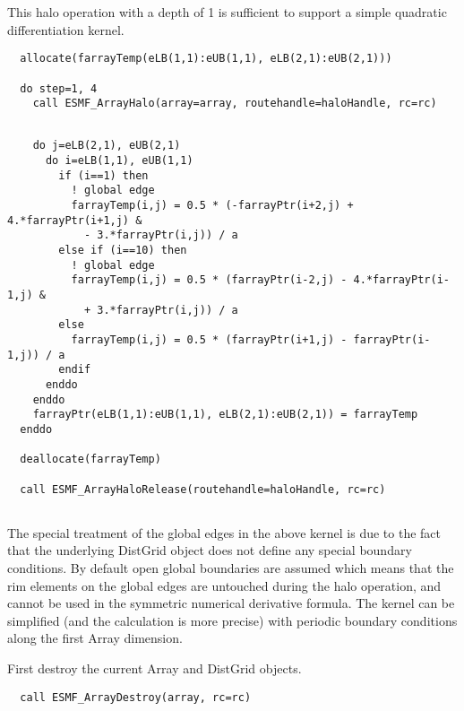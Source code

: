 
   This halo operation with a depth of 1 is sufficient to support a simple
   quadratic differentiation kernel. 

 \begin{verbatim}
  allocate(farrayTemp(eLB(1,1):eUB(1,1), eLB(2,1):eUB(2,1)))

  do step=1, 4
    call ESMF_ArrayHalo(array=array, routehandle=haloHandle, rc=rc)
 
\end{verbatim}
 

 \begin{verbatim}
    do j=eLB(2,1), eUB(2,1)
      do i=eLB(1,1), eUB(1,1)
        if (i==1) then
          ! global edge
          farrayTemp(i,j) = 0.5 * (-farrayPtr(i+2,j) + 4.*farrayPtr(i+1,j) &
            - 3.*farrayPtr(i,j)) / a
        else if (i==10) then
          ! global edge
          farrayTemp(i,j) = 0.5 * (farrayPtr(i-2,j) - 4.*farrayPtr(i-1,j) &
            + 3.*farrayPtr(i,j)) / a
        else
          farrayTemp(i,j) = 0.5 * (farrayPtr(i+1,j) - farrayPtr(i-1,j)) / a
        endif
      enddo
    enddo
    farrayPtr(eLB(1,1):eUB(1,1), eLB(2,1):eUB(2,1)) = farrayTemp
  enddo
  
  deallocate(farrayTemp)

  call ESMF_ArrayHaloRelease(routehandle=haloHandle, rc=rc)
 
\end{verbatim}
 

   The special treatment of the global edges in the above kernel is due to the 
   fact that the underlying DistGrid object does not define any special 
   boundary conditions. By default open global boundaries are assumed which
   means that the rim elements on the global edges are untouched during
   the halo operation, and cannot be used in the symmetric numerical derivative
   formula. The kernel can be simplified (and the calculation is more precise)
   with periodic boundary conditions along the first Array dimension.
  
   First destroy the current Array and DistGrid objects. 

 \begin{verbatim}
  call ESMF_ArrayDestroy(array, rc=rc)
 
\end{verbatim}
 
